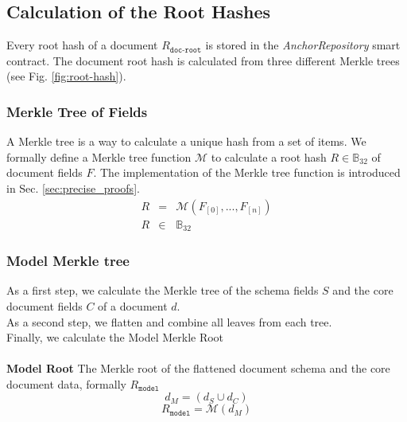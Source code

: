 \subsection{Calculation of the Root Hashes}
Every root hash of a document $R_{\texttt{doc-root}}$ is stored in the
\textit{AnchorRepository} smart contract. The document root hash is calculated from three different Merkle trees (see Fig. \ref{fig:root-hash}). 
\subsubsection{Merkle Tree of Fields}
A Merkle tree is a way to calculate a unique hash from a set of items. We formally define a Merkle tree function $\mathcal{M}$ to calculate a root hash $R \in \mathbb{B}_{32}$ of document fields $F$. The implementation of the Merkle tree function is introduced in Sec. \ref{sec:precise_proofs}.
 \begin{eqnarray}
 R & = &\mathcal{M}(F_{[0]},...,F_{[n]}) \\
 R & \in & \mathbb{B}_{32}
\end{eqnarray}
\newline
\subsubsection{Model Merkle tree}
As a first step, we calculate the Merkle tree of the schema fields $S$ and the core document fields $C$ of a document $d$.\\
As a second step, we flatten and combine all leaves from each tree.\\ 
Finally, we calculate the Model Merkle Root\\\\
\textbf{Model Root} The Merkle root of the flattened document schema and the core document data, formally $R_{{\texttt{model}}}$ 
\newline
\begin{equation}
    d_M = (d_S \cup d_C)
\end{equation}
\begin{equation}
    R_{{\texttt{model}}} = \mathcal{M}(d_M)
\end{equation}
\newline

